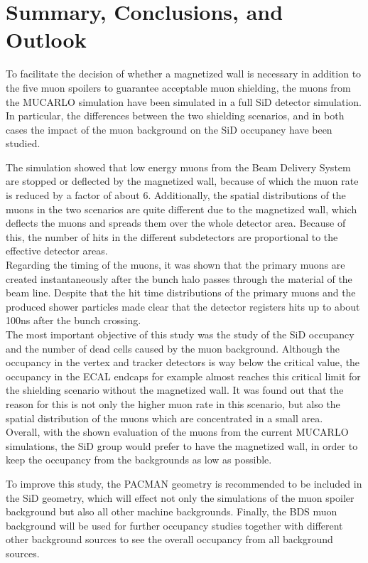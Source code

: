 \section{Summary, Conclusions, and Outlook}

To facilitate the decision of whether a magnetized wall is necessary in addition to the five muon spoilers to guarantee acceptable muon shielding, the muons from the MUCARLO simulation have been simulated in a full SiD detector simulation.
In particular, the differences between the two shielding scenarios, and in both cases the impact of the muon background on the SiD occupancy have been studied.

The simulation showed that low energy muons from the Beam Delivery System are stopped or deflected by the magnetized wall, because of which the muon rate is reduced by a factor of about 6.
Additionally, the spatial distributions of the muons in the two scenarios are quite different due to the magnetized wall, which deflects the muons and spreads them over the whole detector area.
Because of this, the number of hits in the different subdetectors are proportional to the effective detector areas.\\
Regarding the timing of the muons, it was shown that the primary muons are created instantaneously after the bunch halo passes through the material of the beam line.
Despite that the hit time distributions of the primary muons and the produced shower particles made clear that the detector registers hits up to about \unit{100}{ns} after the bunch crossing.\\
The most important objective of this study was the study of the SiD occupancy and the number of dead cells caused by the muon background.
Although the occupancy in the vertex and tracker detectors is way below the critical value, the occupancy in the ECAL endcaps for example almost reaches this critical limit for the shielding scenario without the magnetized wall.
It was found out that the reason for this is not only the higher muon rate in this scenario, but also the spatial distribution of the muons which are concentrated in a small area.\\
Overall, with the shown evaluation of the muons from the current MUCARLO simulations, the SiD group would prefer to have the magnetized wall, in order to keep the occupancy from the backgrounds as low as possible.

To improve this study, the PACMAN geometry is recommended to be included in the SiD geometry, which will effect not only the simulations of the muon spoiler background but also all other machine backgrounds.
Finally, the BDS muon background will be used for further occupancy studies together with different other background sources to see the overall occupancy from all background sources.

